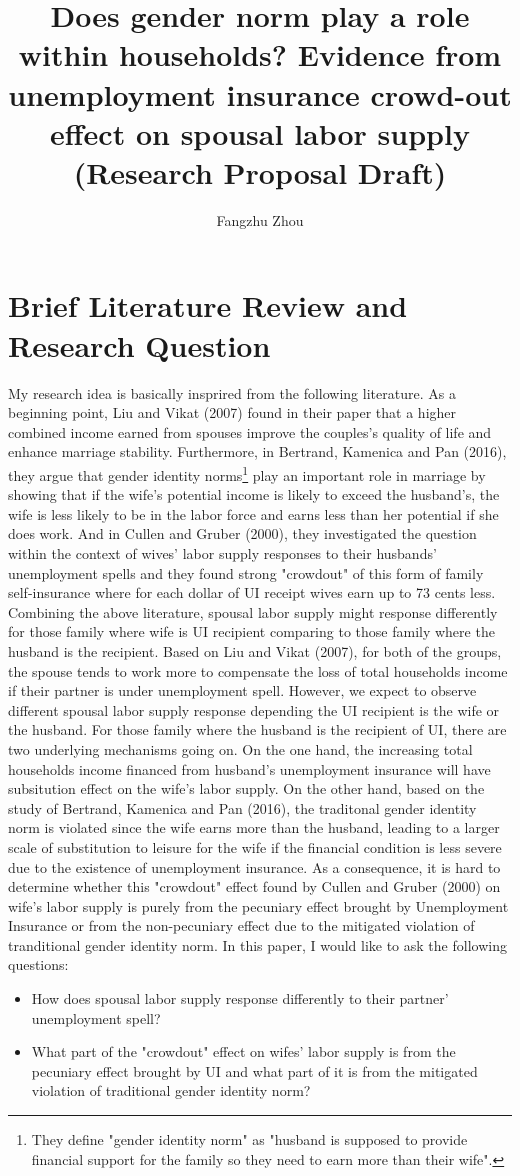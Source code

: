 \documentclass[legalpaper,12pt,margin=1in]{article}
\title{Does gender norm play a role within households? Evidence from unemployment insurance crowd-out effect on spousal labor supply (Research Proposal Draft)}
\author{Fangzhu Zhou}
\begin{document}
\maketitle
\section{Brief Literature Review and Research Question}
My research idea is basically insprired from the following literature. As a beginning point, Liu and Vikat (2007) found in their paper that a higher combined income earned from spouses improve the couples's quality of life and enhance marriage stability. Furthermore, in Bertrand, Kamenica and Pan (2016), they argue that gender identity norms\footnote{They define "gender identity norm" as "husband is supposed to provide financial support for the family so they need to earn more than their wife".} play an important role in marriage by showing that if the wife's potential income is likely to exceed the husband's, the wife is less likely to be in the labor force and earns less than her potential if she does work. And in Cullen and Gruber (2000), they investigated the question within the context of wives' labor supply responses to their husbands' unemployment spells and they found strong "crowdout" of this form of family self-insurance where for each dollar of UI receipt wives earn up to 73 cents less. Combining the above literature, spousal labor supply might response differently for those family where wife is UI recipient comparing to those family where the husband is the recipient. Based on Liu and Vikat (2007), for both of the groups, the spouse tends to work more to compensate the loss of total households income if their partner is under unemployment spell. However, we expect to observe different spousal labor supply response depending the UI recipient is the wife or the husband. For those family where the husband is the recipient of UI, there are two underlying mechanisms going on. On the one hand, the increasing total households income financed from husband's unemployment insurance will have subsitution effect on the wife's labor supply. On the other hand, based on the study of Bertrand, Kamenica and Pan (2016), the traditonal gender identity norm is violated since the wife earns more than the husband, leading to a larger scale of substitution to leisure for the wife if the financial condition is less severe due to the existence of unemployment insurance. As a consequence, it is hard to determine whether this "crowdout" effect found by Cullen and Gruber (2000) on wife's labor supply is purely from the pecuniary effect brought by Unemployment Insurance or from the non-pecuniary effect due to the mitigated violation of tranditional gender identity norm. In this paper, I would like to ask the following questions:
\begin{itemize}
\item How does spousal labor supply response differently to their partner' unemployment spell?
\item What part of the "crowdout" effect on wifes' labor supply is from the pecuniary effect brought by UI and what part of it is from the mitigated violation of traditional gender identity norm?
\end{itemize}
\end{document}

